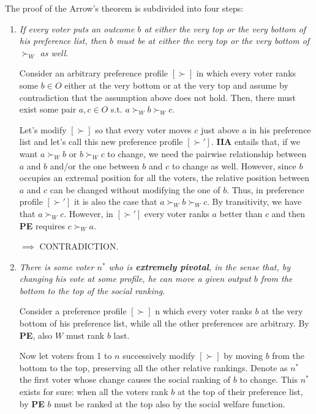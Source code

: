\noindent The proof of the Arrow's theorem is subdivided into four steps:
\begin{enumerate}
	\item \textit{If every voter puts an outcome $b$ at either the very top or 
	the very bottom of his preference list, then $b$ must be at either the very 
	top or the very bottom of $\succ_W$ as well}.

	\noindent Consider an arbitrary preference profile $[\succ]$ in which every 
	voter ranks some $b \in O$ either at the very bottom or at the very top and 
	assume by contradiction that the assumption above does not hold. Then, there 
	must exist some pair $a,c \in O$ s.t. $a \succ_W b \succ_W c$.

	\noindent Let's modify $[\succ]$ so that every voter moves $c$ just above 
	$a$ in his preference list and let's call this new preference profile 
	$[\succ']$. \textbf{IIA} entails that, if we want $a \succ_W b$ or $b 
	\succ_W c$ to change, we need the pairwise relationship between $a$ and $b$ 
	and/or the one between $b$ and $c$ to change as well. However, since $b$ 
	occupies an extremal position for all the voters, the relative position 
	between $a$ and $c$ can be changed without modifying the one of $b$. Thus, 
	in preference profile $[\succ']$ it is also the case that $a \succ_W b 
	\succ_W c$. By transitivity, we have that $a \succ_W c$. However, in 
	$[\succ']$ every voter ranks $a$ better than $c$ and then \textbf{PE} 
	requires $c \succ_W a$.

	\noindent $\implies$ CONTRADICTION.

	\item \textit{There is some voter $n^*$ who is \textbf{extremely pivotal}, 
	in the sense that, by changing his vote at some profile, he can move a 
	given output $b$ from the bottom to the top of the social ranking}.

	\noindent Consider a preference profile $[\succ]$ n which every voter ranks 
	$b$ at the very bottom of his preference list, while all the other 
	preferences are arbitrary. By \textbf{PE}, also $W$ must rank $b$ last.

	\noindent Now let voters from 1 to $n$ successively modify $[\succ]$ by 
	moving $b$ from the bottom to the top, preserving all the other relative 
	rankings. Denote as $n^*$ the first voter whose change causes the social 
	ranking of $b$ to change. This $n^*$ exists for sure: when all the voters 
	rank $b$ at the top of their preference list, by \textbf{PE} $b$ must be 
	ranked at the top also by the social welfare function.


\end{enumerate}

